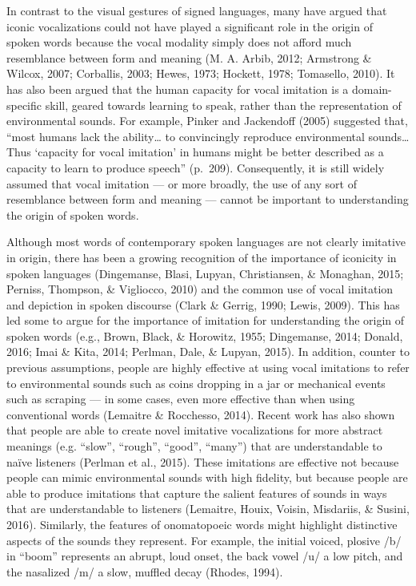 \documentclass[english,floatsintext,man]{apa6}
\theoremstyle{definition}
\theoremstyle{definition}
\theoremstyle{definition}
\theoremstyle{remark}
\begin{document}
In contrast to the visual gestures of signed languages, many have argued
that iconic vocalizations could not have played a significant role in
the origin of spoken words because the vocal modality simply does not
afford much resemblance between form and meaning (M. A. Arbib, 2012;
Armstrong \& Wilcox, 2007; Corballis, 2003; Hewes, 1973; Hockett, 1978;
Tomasello, 2010). It has also been argued that the human capacity for
vocal imitation is a domain-specific skill, geared towards learning to
speak, rather than the representation of environmental sounds. For
example, Pinker and Jackendoff (2005) suggested that, \enquote{most
humans lack the ability\ldots{} to convincingly reproduce environmental
sounds\ldots{} Thus \enquote{capacity for vocal imitation} in humans
might be better described as a capacity to learn to produce speech}
(p.~209). Consequently, it is still widely assumed that vocal imitation
--- or more broadly, the use of any sort of resemblance between form and
meaning --- cannot be important to understanding the origin of spoken
words.

Although most words of contemporary spoken languages are not clearly
imitative in origin, there has been a growing recognition of the
importance of iconicity in spoken languages (Dingemanse, Blasi, Lupyan,
Christiansen, \& Monaghan, 2015; Perniss, Thompson, \& Vigliocco, 2010)
and the common use of vocal imitation and depiction in spoken discourse
(Clark \& Gerrig, 1990; Lewis, 2009). This has led some to argue for the
importance of imitation for understanding the origin of spoken words
(e.g., Brown, Black, \& Horowitz, 1955; Dingemanse, 2014; Donald, 2016;
Imai \& Kita, 2014; Perlman, Dale, \& Lupyan, 2015). In addition,
counter to previous assumptions, people are highly effective at using
vocal imitations to refer to environmental sounds such as coins dropping
in a jar or mechanical events such as scraping --- in some cases, even
more effective than when using conventional words (Lemaitre \&
Rocchesso, 2014). Recent work has also shown that people are able to
create novel imitative vocalizations for more abstract meanings (e.g.
\enquote{slow}, \enquote{rough}, \enquote{good}, \enquote{many}) that
are understandable to naïve listeners (Perlman et al., 2015). These
imitations are effective not because people can mimic environmental
sounds with high fidelity, but because people are able to produce
imitations that capture the salient features of sounds in ways that are
understandable to listeners (Lemaitre, Houix, Voisin, Misdariis, \&
Susini, 2016). Similarly, the features of onomatopoeic words might
highlight distinctive aspects of the sounds they represent. For example,
the initial voiced, plosive /b/ in \enquote{boom} represents an abrupt,
loud onset, the back vowel /u/ a low pitch, and the nasalized /m/ a
slow, muffled decay (Rhodes, 1994).
\end{document}
